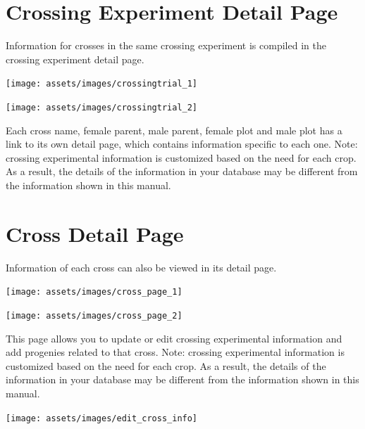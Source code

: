 \documentclass[
  12pt,
]{book}
\begin{document}
\hypertarget{crossing-experiment-detail-page}{%
\section{Crossing Experiment Detail Page}\label{crossing-experiment-detail-page}}

Information for crosses in the same crossing experiment is compiled in the crossing experiment detail page.

\begin{center}\texttt{[image: assets/images/crossingtrial\_1]} \end{center}

\begin{center}\texttt{[image: assets/images/crossingtrial\_2]} \end{center}

Each cross name, female parent, male parent, female plot and male plot has a link to its own detail page, which contains information specific to each one. Note: crossing experimental information is customized based on the need for each crop. As a result, the details of the information in your database may be different from the information shown in this manual.

\hypertarget{cross-detail-page}{%
\section{Cross Detail Page}\label{cross-detail-page}}

Information of each cross can also be viewed in its detail page.

\begin{center}\texttt{[image: assets/images/cross\_page\_1]} \end{center}

\begin{center}\texttt{[image: assets/images/cross\_page\_2]} \end{center}

This page allows you to update or edit crossing experimental information and add progenies related to that cross. Note: crossing experimental information is customized based on the need for each crop. As a result, the details of the information in your database may be different from the information shown in this manual.

\begin{center}\texttt{[image: assets/images/edit\_cross\_info]} \end{center}
\end{document}
